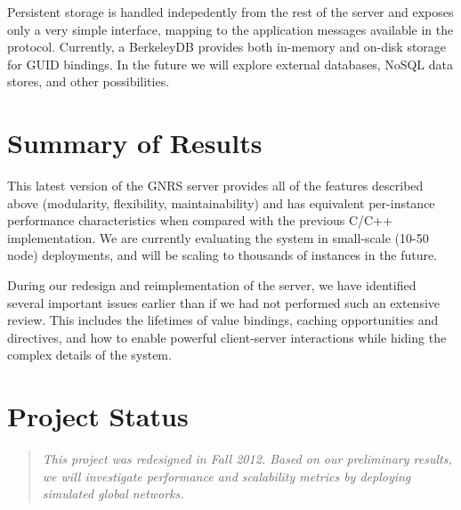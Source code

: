 \documentclass[conference, 11pt]{IEEEtran}
\begin{document}
Persistent storage is handled indepedently from the rest of the server and
exposes only a very simple interface, mapping to the application messages
available in the protocol.  Currently, a BerkeleyDB provides both in-memory
and on-disk storage for GUID bindings.  In the future we will explore external
databases, NoSQL data stores, and other possibilities.

\section{Summary of Results}
This latest version of the GNRS server provides all of the features described
above (modularity, flexibility, maintainability) and has equivalent
per-instance performance characteristics when compared with the previous C/C++
implementation.  We are currently evaluating the system in small-scale (10-50
node) deployments, and will be scaling to thousands of instances in the
future.

During our redesign and reimplementation of the server, we have identified
several important issues earlier than if we had not performed such an
extensive review.  This includes the lifetimes of value bindings, caching
opportunities and directives, and how to enable powerful client-server
interactions while hiding the complex details of the system.

\section{Project Status}

\begin{quotation}
\em This project was redesigned in Fall 2012. Based on our preliminary
results, we will investigate performance and scalability metrics by deploying
simulated global networks.
\end{quotation} 



\end{document}
